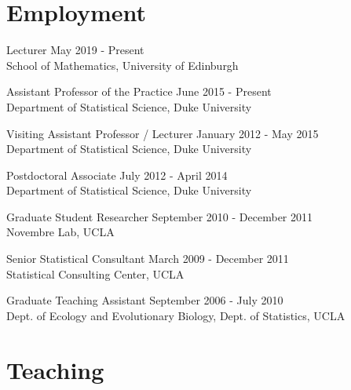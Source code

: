\documentclass[margin,line]{res}
\begin{document}
\begin{resume}
\vspace{3mm}

%

\section{\sc Employment}

Lecturer \hfill May 2019 - Present \\
{School of Mathematics}, University of Edinburgh \\
\vspace{-0.5cm}

Assistant Professor of the Practice \hfill June 2015 - Present \\
{Department of Statistical Science}, Duke University \\
\vspace{-0.5cm}

Visiting Assistant Professor / Lecturer  \hfill January 2012 - May 2015 \\
{Department of Statistical Science}, Duke University \\
\vspace{-0.5cm}

Postdoctoral Associate  \hfill July 2012 - April 2014 \\
{Department of Statistical Science}, Duke University \\
\vspace{-0.5cm}

Graduate Student Researcher \hfill September 2010 - December 2011 \\
{Novembre Lab}, UCLA \\
\vspace{-0.5cm}

Senior Statistical Consultant \hfill March 2009 - December 2011 \\
{Statistical Consulting Center}, UCLA \\
\vspace{-0.50cm}

Graduate Teaching Assistant \hfill September 2006 - July 2010 \\
{Dept. of Ecology and Evolutionary Biology, Dept. of Statistics}, UCLA \\

\vspace{3mm}

\section{\sc Teaching}


\end{resume}
\end{document}
